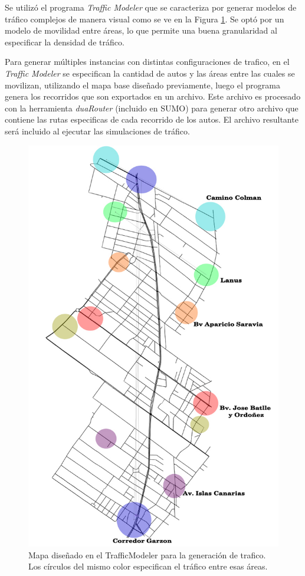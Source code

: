 Se utilizó el programa \emph{Traffic Modeler} \citep{TrafficModeler} que se caracteriza por generar modelos de tráfico complejos de manera visual como se ve en la Figura \ref{fig:areaflow1}. Se optó por un modelo de movilidad entre áreas, lo que permite una buena granularidad al especificar la densidad de tráfico. 

Para generar múltiples instancias con distintas configuraciones de trafico, en el \emph{Traffic Modeler} se especifican la cantidad de autos y las áreas entre las cuales se movilizan, utilizando el mapa base diseñado previamente, luego el programa genera los recorridos que son exportados en un archivo. Este archivo es procesado con la herramienta \emph{duaRouter} (incluido en SUMO) para generar otro archivo que contiene las rutas especificas de cada recorrido de los autos. El archivo resultante será incluido al ejecutar las simulaciones de tráfico.





\begin{figure}[h]
	\centering
	\includegraphics[width=0.5\linewidth]{Figures/areaflow1}
	\caption[Mapa diseñado en el TrafficModeler para la generación de tráfico.]{Mapa diseñado en el TrafficModeler para la generación de trafico. Los círculos del mismo color especifican el tráfico entre esas áreas. }
	\label{fig:areaflow1}
\end{figure}

